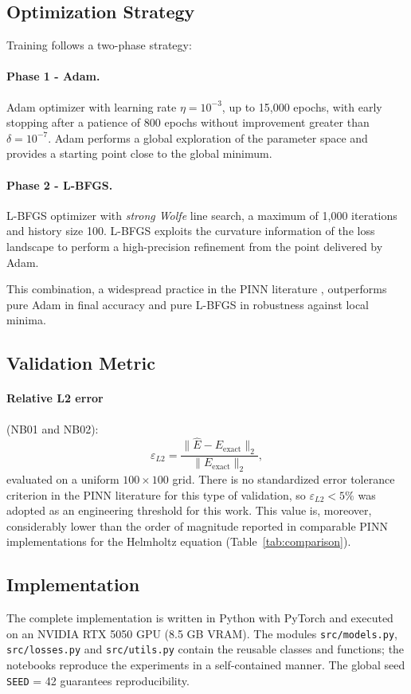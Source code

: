 \subsection{Optimization Strategy}
\label{subsec:optimization}

Training follows a two-phase strategy:

\paragraph{Phase 1 - Adam.}
Adam optimizer with learning rate $\eta = 10^{-3}$, up to 15{,}000 epochs, with
early stopping after a patience of 800 epochs without improvement greater than
$\delta = 10^{-7}$.
Adam performs a global exploration of the parameter space and provides a starting
point close to the global minimum.

\paragraph{Phase 2 - L-BFGS.}
L-BFGS optimizer with \textit{strong Wolfe} line search, a maximum of 1{,}000
iterations and history size 100.
L-BFGS exploits the curvature information of the loss landscape to perform a
high-precision refinement from the point delivered by Adam.

This combination, a widespread practice in the PINN literature
\cite{Cuomo2022_review}, outperforms pure Adam in final accuracy and pure L-BFGS in
robustness against local minima.

\subsection{Validation Metric}
\label{subsec:metrics}

\paragraph{Relative L2 error} (NB01 and NB02):
%
\begin{equation}
  \varepsilon_{L2} = \frac{\|\hat{E} - E_{\mathrm{exact}}\|_2}{\|E_{\mathrm{exact}}\|_2},
  \label{eq:l2}
\end{equation}
%
evaluated on a uniform $100 \times 100$ grid.
There is no standardized error tolerance criterion in the PINN literature for this
type of validation, so $\varepsilon_{L2} < 5\%$ was adopted as an engineering
threshold for this work. This value is, moreover, considerably lower than the order
of magnitude reported in comparable PINN implementations for the Helmholtz equation
(Table~\ref{tab:comparison}).

\subsection{Implementation}
\label{subsec:implementation}

The complete implementation is written in Python with PyTorch and executed on an
NVIDIA RTX 5050 GPU (8.5 GB VRAM).
The modules \texttt{src/models.py}, \texttt{src/losses.py} and
\texttt{src/utils.py} contain the reusable classes and functions; the notebooks
reproduce the experiments in a self-contained manner.
The global seed \texttt{SEED} = 42 guarantees reproducibility.
